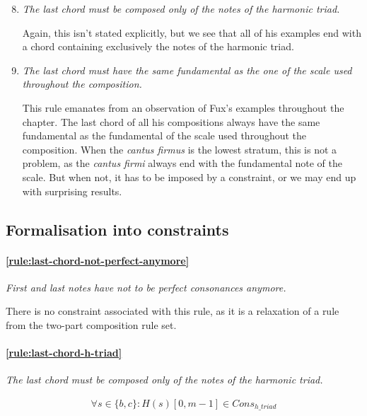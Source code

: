 \begin{enumerate}[wide, label=\bfseries G\arabic*]
    \setcounter{enumi}{7} %

    \item\label{rule:last-chord-h-triad} \textit{The last chord must be composed only of the notes of the harmonic triad.} 

    Again, this isn't stated explicitly, but we see that all of his examples end with a chord containing exclusively the notes of the harmonic triad.
    
    \item \textit{The last chord must have the same fundamental as the one of the scale used throughout the composition.}\label{rule:same-fundamental}

    This rule emanates from an observation of Fux's examples throughout the chapter. The last chord of all his compositions always have the same fundamental as the fundamental of the scale used throughout the composition.
    When the \textit{cantus firmus} is the lowest stratum, this is not a problem, as the \textit{cantus firmi} always end with the fundamental note of the scale. But when not, it has to be imposed by a constraint, or we may end up with surprising results.
\end{enumerate}

\subsection{Formalisation into constraints} \label{sec:generalconstraints}
    \paragraph{\ref{rule:last-chord-not-perfect-anymore}} \textit{First and last notes have not to be perfect consonances anymore.}

    There is no constraint associated with this rule, as it is a relaxation of a rule from the two-part composition rule set.

    \paragraph{\ref{rule:last-chord-h-triad}} \textit{The last chord must be composed only of the notes of the harmonic triad.} 
    
    \begin{equation} \begin{aligned}
    \forall s \in \{b, c\} \colon H(s)[0, m-1] \in Cons_{h\_triad}
    \end{aligned} \end{equation}

